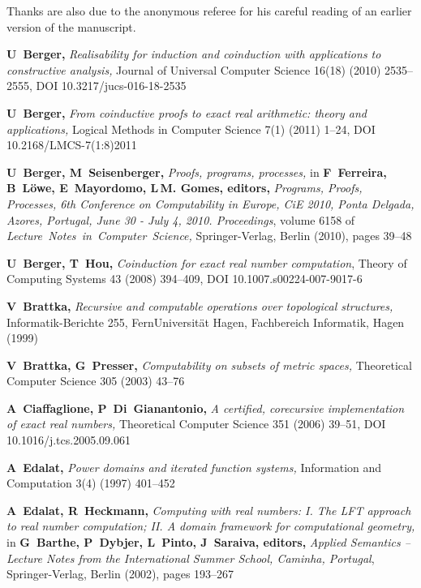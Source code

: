 \documentclass[microtype]{jloganal}
\theoremstyle{plain}
\theoremstyle{definition}
\begin{document}
Thanks are also due to the anonymous referee for his careful reading of an earlier version of the manuscript.


 


\begin{thebibliography}{MRE07}

\textbf{U~Berger,}
\newblock \emph{Realisability for induction and coinduction with applications to
  constructive analysis,}
\newblock Journal of Universal Computer Science 16(18) (2010) 2535--2555, DOI 10.3217/jucs-016-18-2535

\textbf{U~Berger,}
\newblock \emph{From coinductive proofs to exact real arithmetic: theory and
  applications,}
\newblock Logical Methods in Computer Science 7(1) (2011) 1--24, DOI 10.2168/LMCS-7(1:8)2011

\textbf{U~Berger, M~Seisenberger,}
\newblock \emph{Proofs, programs, processes,}
\newblock in \textbf{F~Ferreira, B~L\"owe, E~Mayordomo, L\,M. Gomes, editors,}
  {\em Programs, Proofs, Processes, 6th Conference on Computability in Europe,
  CiE 2010, Ponta Delgada, Azores, Portugal, June 30 - July 4, 2010.
  Proceedings}, volume 6158 of \emph{Lecture~Notes~in~Computer~Science,} Springer-Verlag, Berlin (2010), pages
  39--48

\textbf{U~Berger, T~Hou,}
\newblock \emph{Coinduction for exact real number computation},
\newblock Theory of Computing Systems 43 (2008) 394--409, DOI 10.1007.s00224-007-9017-6
  
\textbf{V~Brattka,}
\newblock \emph{Recursive and computable operations over topological structures,} Informatik-Berichte 255, FernUniversit\"at Hagen, Fachbereich Informatik, Hagen (1999)

\textbf{V~Brattka, G~Presser,}
\newblock \emph{Computability on subsets of metric spaces,}
\newblock Theoretical Computer Science 305 (2003) 43--76

\textbf{A~Ciaffaglione, P~Di~Gianantonio,}
\newblock \emph{A certified, corecursive implementation of exact real numbers,}
\newblock Theoretical Computer Science 351 (2006) 39--51, DOI 10.1016/j.tcs.2005.09.061

\textbf{A~Edalat,}
\newblock \emph{Power domains and iterated function systems,}
\newblock Information and Computation 3(4) (1997) 401--452

\textbf{A~Edalat, R~Heckmann,}
\newblock \emph{Computing with real numbers: I. {T}he {LFT} approach to real number
  computation; {II.} {A} domain framework for computational geometry,}
\newblock in \textbf{G~Barthe, P~Dybjer, L~Pinto, J~Saraiva, editors,} \emph{
  Applied Semantics -- Lecture Notes from the International Summer School,
  Caminha, Portugal}, Springer-Verlag, Berlin (2002), pages 193--267
  

\end{thebibliography}
\end{document}
